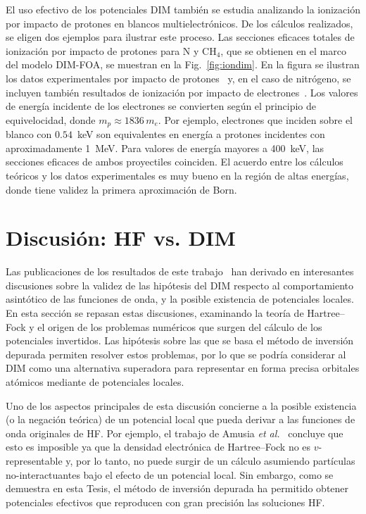El uso efectivo de los potenciales DIM también se estudia analizando  
la ionización por impacto de protones en blancos multielectrónicos. De 
los cálculos realizados, se eligen dos ejemplos para ilustrar este 
proceso. Las secciones eficaces totales de ionización por impacto de 
protones para N y CH$_4$, que se obtienen en el marco del modelo 
DIM-FOA, se muestran en la Fig.~\ref{fig:iondim}. En la figura se 
ilustran los datos experimentales por impacto de 
protones~\cite{Rudd:83,Rudd:85} y, en el caso de nitrógeno, se incluyen 
también resultados de ionización por impacto de 
electrones~\cite{Brook:78}. Los valores de energía incidente de los 
electrones se convierten según el principio de equivelocidad, donde 
$m_p\approx 1836\,m_e$. Por ejemplo, electrones que inciden sobre el 
blanco con $0.54$~keV son equivalentes en energía a protones incidentes 
con aproximadamente 1~MeV. Para valores de energía mayores a 400~keV, 
las secciones eficaces de ambos proyectiles coinciden. El acuerdo entre 
los cálculos teóricos y los datos experimentales es muy bueno en la 
región de altas energías, donde tiene validez la primera aproximación de 
Born. 


\section{Discusión: HF vs. DIM}
\label{sec:discusionHF}

Las publicaciones de los resultados de este trabajo~\cite{Mendez:16,
Mendez:19dim,Mendez:18,Mitnik:19} han derivado en interesantes 
discusiones sobre la validez de las hipótesis del DIM respecto al 
comportamiento asintótico de las funciones de onda, y la posible 
existencia de potenciales locales. En esta sección se repasan estas 
discusiones, examinando la teoría de Hartree--Fock y el origen de los 
problemas numéricos que surgen del cálculo de los potenciales 
invertidos. Las hipótesis sobre las que se basa el método de inversión 
depurada permiten resolver estos problemas, por lo que se podría 
considerar al DIM como una alternativa superadora para representar en 
forma precisa orbitales atómicos mediante de potenciales locales.

Uno de los aspectos principales de esta discusión concierne a la posible 
existencia (o la negación teórica) de un potencial local que pueda 
derivar a las funciones de onda originales de HF. Por ejemplo, el 
trabajo de Amusia \textit{et al.}~\cite{Amusia:04} concluye que esto es 
imposible ya que la densidad electrónica de Hartree--Fock no es 
$v$-representable y, por lo tanto, no puede surgir de un cálculo 
asumiendo partículas no-interactuantes bajo el efecto de un potencial 
local. Sin embargo, como se demuestra en esta Tesis, el método de 
inversión depurada ha permitido obtener potenciales efectivos que 
reproducen con gran precisión las soluciones HF.

